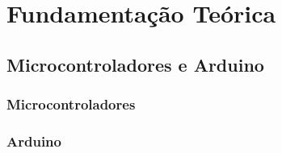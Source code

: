 
\chapter{Fundamentação Teórica}
\label{chap:fundamentacaoTeorica}



    \section{Microcontroladores e Arduino}



        \subsection{Microcontroladores}



        \subsection{Arduino}
        
        